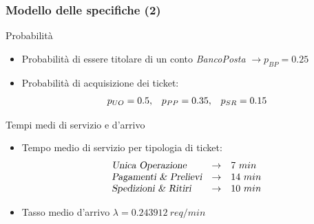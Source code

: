 \documentclass[
	usepdftitle=false,
	xcolor={table, dvipsnames},
	hyperref={
		pdftitle={Studio delle prestazioni di un Ufficio Postale ispirato a Poste Italiane},
    	pdfauthor={A. Chillotti, C. Cuffaro e S. Tiberi}
    }
]{beamer}
\newcommand{\uo}{\textsl{Unica Operazione}}
\newcommand{\pp}{\textsl{Pagamenti \& Prelievi}}
\newcommand{\sr}{\textsl{Spedizioni \& Ritiri}}
\begin{document}
\begin{frame}
\frametitle{Modello delle specifiche (2)}
\begin{block}{Probabilità}
\begin{itemize}
\item Probabilità di essere titolare di un conto \textsl{BancoPosta} $\to p_{BP} = 0.25$
\item Probabilità di acquisizione dei ticket:
\begin{equation*}
\begin{array}{c c c}
p_{UO} = 0.5, & p_{PP} = 0.35, & p_{SR} = 0.15
\end{array}
\end{equation*} 
\end{itemize}
\end{block}

\begin{block}{Tempi medi di servizio e d'arrivo}
\begin{itemize}
\item Tempo medio di servizio per tipologia di ticket:
\begin{equation*}
\begin{array}{l c l}
\uo{} & \rightarrow & 7\ min \\
\pp{} & \rightarrow & 14\ min \\
\sr{} & \rightarrow & 10\ min
\end{array}
\end{equation*} 
\item Tasso medio d'arrivo $\lambda = 0.243912\ req/min$ 
\end{itemize}
\end{block}
\end{frame}
\end{document}
